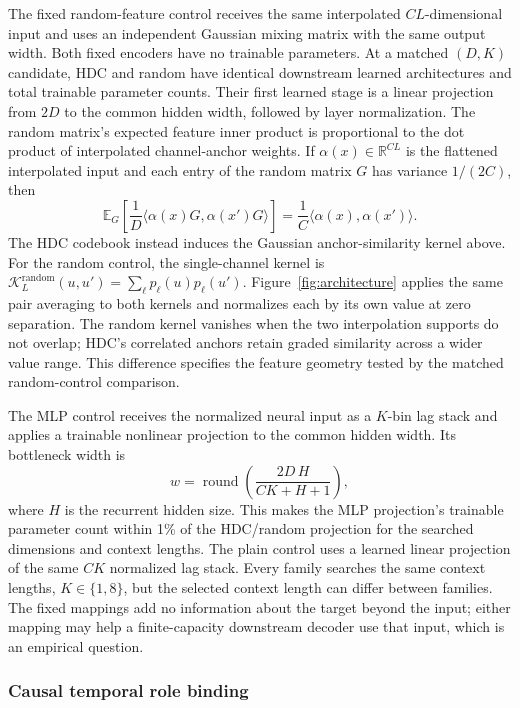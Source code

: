 The fixed random-feature control receives the same interpolated
$CL$-dimensional input and uses an independent Gaussian mixing matrix with the
same output width. Both fixed encoders have no trainable parameters. At a
matched $(D,K)$ candidate, HDC and random have identical downstream learned
architectures and total trainable parameter counts. Their first learned stage
is a linear projection from $2D$ to the common hidden width, followed by layer
normalization. The random matrix's expected feature inner
product is proportional to the dot product of interpolated channel-anchor
weights. If $\alpha(x)\in\mathbb{R}^{CL}$ is the flattened interpolated input
and each entry of the random matrix $G$ has variance $1/(2C)$, then
\[
  \mathbb{E}_{G}\!\left[\frac{1}{D}
    \langle \alpha(x)G,\alpha(x')G\rangle\right]
  =\frac{1}{C}\langle\alpha(x),\alpha(x')\rangle.
\]
The HDC codebook instead induces the Gaussian anchor-similarity kernel above.
For the random control, the single-channel kernel is
$\mathcal{K}^{\mathrm{random}}_L(u,u')=\sum_\ell p_\ell(u)p_\ell(u')$.
Figure~\ref{fig:architecture} applies the same pair averaging to both
kernels and normalizes each by its own value at zero separation. The random
kernel vanishes when the two interpolation supports do not overlap; HDC's
correlated anchors retain graded similarity across a wider value range.
This difference specifies the feature geometry tested by the matched
random-control comparison.

The MLP control receives the normalized neural input as a $K$-bin lag stack and
applies a trainable nonlinear projection to the common hidden width. Its
bottleneck width is
\[
 w=\operatorname{round}\!\left(\frac{2D\,H}{C K+H+1}\right),
\]
where $H$ is the recurrent hidden size. This makes the MLP projection's
trainable parameter count within 1\% of the HDC/random projection for the
searched dimensions and context lengths. The plain control uses a learned
linear projection of the same $C K$ normalized lag stack. Every family searches the
same context lengths, $K\in\{1,8\}$, but the selected context length can differ
between families. The fixed mappings add no information about the target
beyond the input; either mapping may help a finite-capacity downstream decoder
use that input, which is an empirical question.

\subsubsection{Causal temporal role binding}

